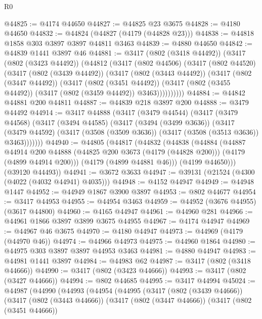 \begin{lexlean}{R0}
\begin{coremodule}
@44825 := @4174 @44650
@44827 := @44825 @23 @3675
@44828 := @4180 @44650
@44832 := @44824 (@44827 (@4179 (@44828 @23)))
@44838 := @44818 @1858 @303 @3897 @3897 @44811 @3463
@44839 := @4880 @44650
@44842 := @44839 @1441 @3897 @46
@44881 := @3417
    (@802 (@3418 @44492))
    (@3417
      (@802 (@3423 @44492))
      (@44812
        (@3417
          (@802 @44506)
          (@3417
            (@802 @44520)
            (@3417
              (@802 (@3439 @44492))
              (@3417
                (@802 (@3443 @44492))
                (@3417
                  (@802 (@3447 @44492))
                  (@3417
                    (@802 (@3451 @44492))
                    (@3417 (@802 (@3455 @44492)) (@3417 (@802 (@3459 @44492)) @3463))))))))))
@44884 := @44842 @44881 @200 @44811
@44887 := @44839 @218 @3897 @200
@44888 := @3479 @44492
@44914 := @3417
    @44888
    (@3417
      (@3479 @44544)
      (@3417
        (@3479 @44568)
        (@3417
          (@3494 @44585)
          (@3417
            (@3494 (@3499 @3636))
            (@3417
              (@3479 @44592)
              (@3417 (@3508 (@3509 @3636)) (@3417 (@3508 (@3513 @3636)) @3463)))))))
@44940 := @44805
    (@44817
      (@44832
        (@44838
          (@44884
            (@44887
              @44914
              @200
              @44888
              (@44825 @200 @3673 (@4179 (@44828 @200)))
              (@4179 (@4899 @44914 @200)))
            (@4179 (@4899 @44881 @46)))
          (@4199 @44650)))
      (@39120 @44493))
@44941 := @3672 @3633
@44947 := @39131 (@21524 (@4300 (@4022 (@4032 @44941) @4035)))
@44948 := @4152 @44947
@44949 := @44948 @1447
@44952 := @44949 @1867 @3900 @3897
@44953 := @802 @44677
@44954 := @3417 @44953
@44955 := @44954 @3463
@44959 := @44952 (@3676 @44955) (@3617 @44800)
@44960 := @4165 @44947
@44961 := @44960 @281
@44966 := @44961 @1866 @3897 @3899 @3675 @44955
@44967 := @4174 @44947
@44969 := @44967 @46 @3675
@44970 := @4180 @44947
@44973 := @44969 (@4179 (@44970 @46))
@44974 := @44966 @44973
@44975 := @44960 @1864
@44980 := @44975 @303 @3897 @3897 @44953 @3463
@44981 := @4880 @44947
@44983 := @44981 @1441 @3897
@44984 := @44983 @62
@44987 := @3417 (@802 (@3418 @44666))
@44990 := @3417 (@802 (@3423 @44666))
@44993 := @3417 (@802 (@3427 @44666))
@44994 := @802 @44685
@44995 := @3417 @44994
@45024 := @44987
    (@44990
      (@44993
        (@44954
          (@44995
            (@3417
              (@802 (@3439 @44666))
              (@3417
                (@802 (@3443 @44666))
                (@3417
                  (@802 (@3447 @44666))
                  (@3417
                    (@802 (@3451 @44666))

\end{coremodule}
\end{lexlean}
